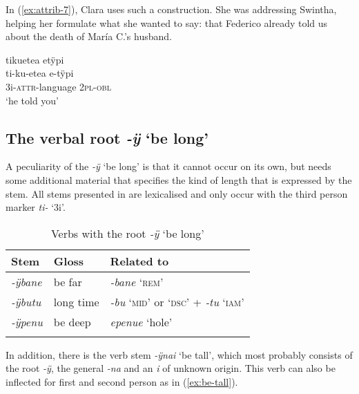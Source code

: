 In (\ref{ex:attrib-7}), Clara uses such a construction. She was addressing Swintha, helping her formulate what she wanted to say: that Federico already told us about the death of María C.’s husband.

\ea\label{ex:attrib-7}
\begingl
\glpreamble tikuetea etÿpi\\
\gla ti-ku-etea e-tÿpi\\
\glb 3i-\textsc{attr}-language 2\textsc{pl}-\textsc{obl}\\
\glft ‘he told you’
\endgl
\trailingcitation{[cux-120410ls.100]}
\xe



\subsection{The verbal root \textit{-ÿ} ‘be long’}\label{sec:StativeVerbs_long}

A peculiarity of the  \textit{-ÿ} ‘be long’ is that it cannot occur on its own, but needs some additional material that specifies the kind of length that is expressed by the stem. All stems presented in  are lexicalised and only occur with the third person marker \textit{ti-} ‘3i’.

\begin{table}
\caption{Verbs with the root \textit{-ÿ} ‘be long’}

\begin{tabular}{lll}
\lsptoprule
Stem & Gloss & Related to \\
\midrule
\textit{-ÿbane} & be far & \textit{-bane} ‘\textsc{rem}’\\
\textit{-ÿbutu} & long time & \textit{-bu} ‘\textsc{mid}’ or ‘\textsc{dsc}’ + \textit{-tu} ‘\textsc{iam}’\\
\textit{-ÿpenu} & be deep & \textit{epenue} ‘hole’\\
\lspbottomrule
\end{tabular}

\label{table:stat-long-verbs}
\end{table}

In addition, there is the verb stem \textit{-ÿnai} ‘be tall’, which most probably consists of the root \textit{-ÿ}, the general  \textit{-na} and an \textit{i} of unknown origin. This verb can also be inflected for first and second person as in (\ref{ex:be-tall}).

